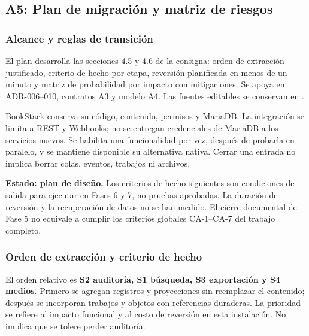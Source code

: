 \clearpage
\subsection{A5: Plan de migración y matriz de riesgos}
\label{sec:fase5-a5}

\subsubsection{Alcance y reglas de transición}

El plan desarrolla las secciones 4.5 y 4.6 de la consigna: orden de extracción
justificado, criterio de hecho por etapa, reversión planificada en menos de
un minuto y matriz de probabilidad por impacto con mitigaciones. Se apoya
en ADR-006--010, contratos A3 y modelo A4. Las fuentes editables se conservan
en .

BookStack conserva su código, contenido, permisos y MariaDB. La integración
se limita a REST y Webhooks; no se entregan credenciales de MariaDB a los
servicios nuevos. Se habilita una funcionalidad por vez, después de probarla
en paralelo, y se mantiene disponible su alternativa nativa. Cerrar una
entrada no implica borrar colas, eventos, trabajos ni archivos.

\textbf{Estado: plan de diseño.} Los criterios de hecho siguientes son
condiciones de salida para ejecutar en Fases 6 y 7, no pruebas aprobadas.
La duración de reversión y la recuperación de datos no se han medido.
El cierre documental de Fase 5 no equivale a cumplir los criterios globales
CA-1--CA-7 del trabajo completo.

\subsubsection{Orden de extracción y criterio de hecho}

El orden relativo es \textbf{S2 auditoría, S1 búsqueda, S3 exportación y S4
medios}. Primero se agregan registros y proyecciones sin reemplazar el
contenido; después se incorporan trabajos y objetos con referencias
duraderas. La prioridad se refiere al impacto funcional y al costo de
reversión en esta instalación. No implica que se tolere perder auditoría.


